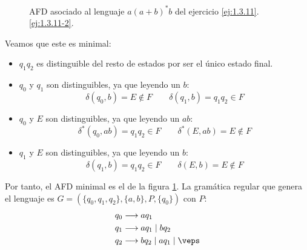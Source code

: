\begin{ejercicio}
\begin{enumerate}
\begin{figure}[H]
            \caption{AFD asociado al lenguaje $a{(a+b)}^{\ast}b$ del ejercicio \ref{ej:1.3.11}.\ref{ej:1.3.11-2}.}
            \label{fig:1.3.11-2-AFD}
        \end{figure}

        Veamos que este es minimal:
        \begin{itemize}
            \item $q_1q_2$ es distinguible del resto de estados por ser el único estado final.
            \item $q_0$ y $q_1$ son distinguibles, ya que leyendo un $b$:
            \begin{equation*}
                \delta(q_0,b)=E\notin F\qquad \delta(q_1,b)=q_1q_2\in F
            \end{equation*}

            \item $q_0$ y $E$ son distinguibles, ya que leyendo un $ab$:
            \begin{equation*}
                \delta^*(q_0,ab)=q_1q_2\in F\qquad \delta^*(E,ab)=E\notin F
            \end{equation*}

            \item $q_1$ y $E$ son distinguibles, ya que leyendo un $b$:
            \begin{equation*}
                \delta(q_1,b)=q_1q_2\in F\qquad \delta(E,b)=E\notin F
            \end{equation*}
        \end{itemize}

        Por tanto, el AFD minimal es el de la figura \ref{fig:1.3.11-2-AFD}. La gramática regular que genera el lenguaje es $G=(\{q_0,q_1,q_2\},\{a,b\},P,\{q_0\})$ con $P$:
        \begin{align*}
            q_0 &\longrightarrow aq_1\\
            q_1 &\longrightarrow aq_1\mid bq_2\\
            q_2 &\longrightarrow bq_2\mid aq_1\mid \veps
        \end{align*}
    \end{enumerate}
\end{ejercicio}


